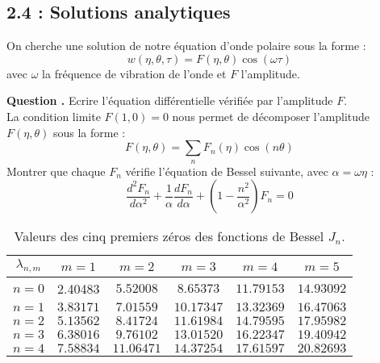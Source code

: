 \documentclass[a4,12pt]{article}
\newcounter{Nbquestion}
\newcommand*\question{%
  \stepcounter{Nbquestion}%
  \textbf{Question \theNbquestion. }}
\begin{document}
				\subsection*{2.4 : Solutions analytiques }
				On cherche une solution de notre équation d'onde polaire sous la forme :
				\[
				  w(\eta,\theta,\tau)=F(\eta,\theta)\cos(\omega \tau)
				\]
				avec $\omega$ la fréquence de vibration de l'onde et $F$ l'amplitude.


				\question Ecrire l'équation différentielle vérifiée par l'amplitude $F$.\\

				La condition limite $F(1,0)=0$ nous permet de décomposer l'amplitude $F(\eta,\theta)$ sous la forme :
				\[
				  F(\eta,\theta)=\sum_n F_n(\eta)\cos(n\theta)
				\]
				Montrer que chaque $F_n$ vérifie l'équation de Bessel suivante, avec  $\alpha=\omega\eta$ :
				\[
				  \frac{d^2 F_n}{d\alpha^2}+\frac{1}{\alpha}\frac{dF_n}{d\alpha}+\left(1-\frac{n^2}{\alpha^2}\right)F_n=0
				\]


				\begin{table}
				  \begin{center}
				    \begin{tabular}{|c|c|c|c|c|c|}
				      \hline
				      $\lambda_{n,m}$&$m=1$  &$m=2$ & $m=3$ &$ m=4$&$m=5$\\
				      \hline
				      $n=0$&2.40483&$5.52008$&$8.65373$&$11.79153$&$14.93092$\\
				      \hline
				      $n=1$&$3.83171$&$7.01559$&$10.17347$&$13.32369$&$16.47063$\\
				      \hline
				      $n=2$&$5.13562$&$8.41724$&$11.61984$&$14.79595$&$17.95982$\\
				      \hline
				      $n=3$&$6.38016$&$9.76102$&$13.01520$&$16.22347$&$19.40942$\\
				      \hline
				      $n=4$&$7.58834$&$11.06471$&$14.37254$&$17.61597$&$20.82693$\\
				      \hline
				    \end{tabular}
				    \caption{Valeurs des cinq premiers zéros des fonctions de Bessel $J_n$.}
				  \end{center}
				\end{table}
\end{document}
